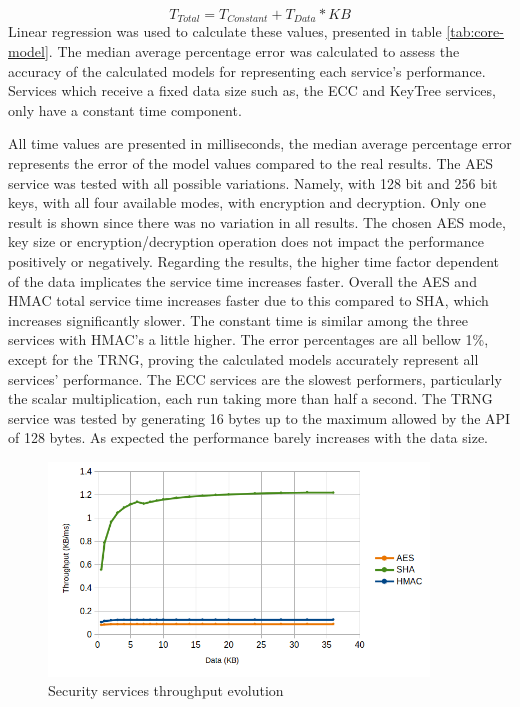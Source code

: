 \begin{equation}
	\label{eq:linear-eq}
	T_{Total} = T_{Constant} + T_{Data} * KB
\end{equation}
Linear regression was used to calculate these values, presented in table \ref{tab:core-model}. The median average percentage error was calculated to assess the accuracy of the calculated models for representing each service's performance. Services which receive a fixed data size such as, the \ac{ECC} and KeyTree services, only have a constant time component.



All time values are presented in milliseconds, the median average percentage error represents the error of the model values compared to the real results.
The \ac{AES} service was tested with all possible variations. Namely, with 128 bit and 256 bit keys, with all four available modes, with encryption and decryption. Only one result is shown since there was no variation in all results. The chosen \ac{AES} mode, key size or encryption/decryption operation does not impact the performance positively or negatively.
Regarding the results, the higher time factor dependent of the data implicates the service time increases faster. Overall the \ac{AES} and \ac{HMAC} total service time increases faster due to this compared to \ac{SHA}, which increases significantly slower. The constant time is similar among the three services with \ac{HMAC}'s a little higher.
The error percentages are all bellow 1\%, except for the TRNG, proving the calculated models accurately represent all services' performance.
The \ac{ECC} services are the slowest performers, particularly the scalar multiplication, each run taking more than half a second.
The TRNG service was tested by generating 16 bytes up to the maximum allowed by the API of 128 bytes. As expected the performance barely increases with the data size.

\begin{figure}[h!]
	\centering
	\includegraphics[width=0.9\textwidth]{./Images/core-tput.png}
	\caption{Security services throughput evolution}
	\label{fig:performance:core-tput}
\end{figure}

